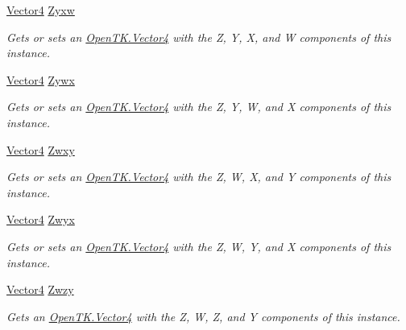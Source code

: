 \begin{DoxyCompactItemize}
\hyperlink{struct_open_t_k_1_1_vector4}{Vector4} \hyperlink{struct_open_t_k_1_1_vector4_ab29481fc7450aaa07ad020e4b8f6aff3}{Zyxw}
\begin{DoxyCompactList}\small\item\em Gets or sets an \hyperlink{struct_open_t_k_1_1_vector4}{Open\-T\-K.\-Vector4} with the Z, Y, X, and W components of this instance. \end{DoxyCompactList}\item 
\hyperlink{struct_open_t_k_1_1_vector4}{Vector4} \hyperlink{struct_open_t_k_1_1_vector4_a0c074234218bea5d90fd5e1a86e6d35b}{Zywx}
\begin{DoxyCompactList}\small\item\em Gets or sets an \hyperlink{struct_open_t_k_1_1_vector4}{Open\-T\-K.\-Vector4} with the Z, Y, W, and X components of this instance. \end{DoxyCompactList}\item 
\hyperlink{struct_open_t_k_1_1_vector4}{Vector4} \hyperlink{struct_open_t_k_1_1_vector4_a9b4ba0bbb30945a9cd03f22c37fe2704}{Zwxy}
\begin{DoxyCompactList}\small\item\em Gets or sets an \hyperlink{struct_open_t_k_1_1_vector4}{Open\-T\-K.\-Vector4} with the Z, W, X, and Y components of this instance. \end{DoxyCompactList}\item 
\hyperlink{struct_open_t_k_1_1_vector4}{Vector4} \hyperlink{struct_open_t_k_1_1_vector4_acfd06f4daca5c108a34e8793304e5611}{Zwyx}
\begin{DoxyCompactList}\small\item\em Gets or sets an \hyperlink{struct_open_t_k_1_1_vector4}{Open\-T\-K.\-Vector4} with the Z, W, Y, and X components of this instance. \end{DoxyCompactList}\item 
\hyperlink{struct_open_t_k_1_1_vector4}{Vector4} \hyperlink{struct_open_t_k_1_1_vector4_a2e2e6a3430dce9badae994c716473602}{Zwzy}
\begin{DoxyCompactList}\small\item\em Gets an \hyperlink{struct_open_t_k_1_1_vector4}{Open\-T\-K.\-Vector4} with the Z, W, Z, and Y components of this instance. \end{DoxyCompactList}\item 

\end{DoxyCompactItemize}
